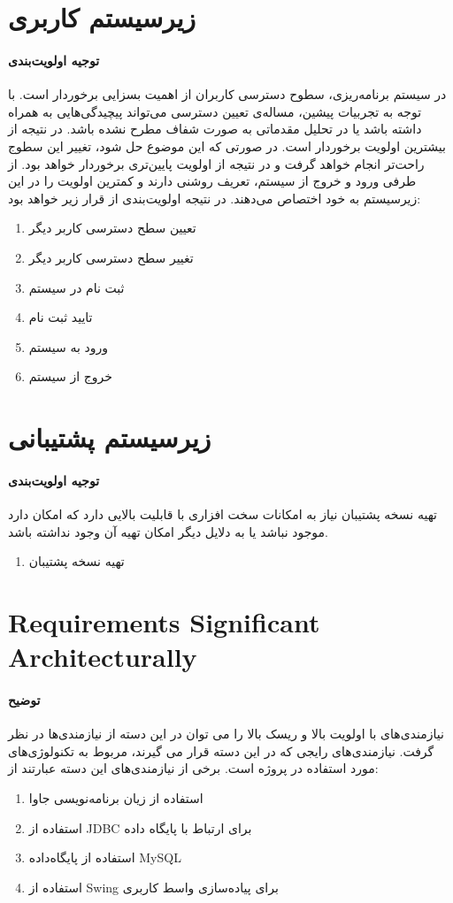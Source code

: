 \section{زیرسیستم کاربری}
\paragraph{توجیه اولویت‌بندی}
در سیستم برنامه‌ریزی، سطوح دسترسی کاربران از اهمیت بسزایی برخوردار است. با توجه به تجربیات پیشین، مساله‌ی تعیین دسترسی می‌تواند پیچیدگی‌هایی به همراه داشته باشد یا در تحلیل مقدماتی به صورت  شفاف مطرح نشده باشد. در نتیجه از بیشترین اولویت برخوردار است. در صورتی که این موضوع حل شود، تغییر این سطوج راحت‌تر انجام خواهد گرفت و در نتیجه از اولویت پایین‌تری برخوردار خواهد بود. از طرفی ورود و خروج از سیستم، تعریف روشنی دارند و کمترین اولویت را در این زیرسیستم به خود اختصاص می‌دهند. در نتیجه اولویت‌بندی از قرار زیر خواهد بود:
\begin{enumerate}
	\item تعیین سطح دسترسی کاربر دیگر
	\item تغییر سطح دسترسی کاربر دیگر
	\item ثبت نام در سیستم
	\item تایید ثبت نام
	\item ورود به سیستم
	\item خروج از سیستم			
\end{enumerate}

\section{زیرسیستم پشتیبانی}
\paragraph{توجیه اولویت‌بندی}
تهیه نسخه پشتیبان نیاز به امکانات سخت افزاری با قابلیت بالایی دارد که امکان دارد موجود نباشد یا به دلایل دیگر امکان تهیه آن وجود نداشته باشد.
\begin{enumerate}
	
	\item تهیه نسخه پشتیبان
\end{enumerate}

\section{Requirements Significant Architecturally}
\paragraph{توضیح}
نیازمندی‌های با اولویت بالا و ریسک بالا را می توان در این دسته از نیازمندی‌ها در نظر گرفت. نیازمندی‌های رایجی که در این دسته قرار می گیرند، مربوط به تکنولوژی‌های مورد استفاده در پروژه است. برخی از نیازمندی‌های این دسته عبارتند از:
\begin{enumerate}
	
	\item استفاده از زیان برنامه‌نویسی جاوا
	\item استفاده از JDBC برای ارتباط با پایگاه داده
	\item استفاده از پایگاه‌داده MySQL
	\item استفاده از Swing برای پیاده‌سازی واسط کاربری
	
\end{enumerate}